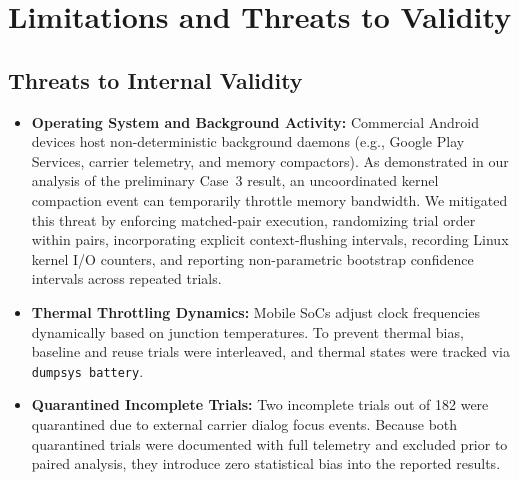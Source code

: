 \section{Limitations and Threats to Validity}
\label{sec:limitations}

\subsection{Threats to Internal Validity}
\begin{itemize}
    \item \textbf{Operating System and Background Activity:} Commercial Android devices host non-deterministic background daemons (e.g., Google Play Services, carrier telemetry, and memory compactors). As demonstrated in our analysis of the preliminary Case~3 result, an uncoordinated kernel compaction event can temporarily throttle memory bandwidth. We mitigated this threat by enforcing matched-pair execution, randomizing trial order within pairs, incorporating explicit context-flushing intervals, recording Linux kernel I/O counters, and reporting non-parametric bootstrap confidence intervals across repeated trials.
    \item \textbf{Thermal Throttling Dynamics:} Mobile SoCs adjust clock frequencies dynamically based on junction temperatures. To prevent thermal bias, baseline and reuse trials were interleaved, and thermal states were tracked via \texttt{dumpsys battery}.
    \item \textbf{Quarantined Incomplete Trials:} Two incomplete trials out of 182 were quarantined due to external carrier dialog focus events. Because both quarantined trials were documented with full telemetry and excluded prior to paired analysis, they introduce zero statistical bias into the reported results.
\end{itemize}

